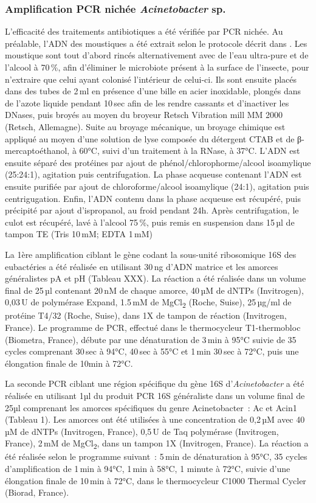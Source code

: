 \subsubsection{Amplification PCR nichée \textit{Acinetobacter} sp.}

L'efficacité des traitements antibiotiques a été vérifiée par PCR nichée.
Au préalable, l'ADN des moustiques a été extrait selon le protocole décrit dans \textcite{zouache2009}.
Les moustique sont tout d'abord rincés alternativement avec de l'eau ultra-pure et de l'alcool à 70\,\%, afin d'éliminer le microbiote présent à la surface de l'insecte, pour n'extraire que celui ayant colonisé l'intérieur de celui-ci.
Ils sont ensuite placés dans des tubes de 2\,ml en présence d'une bille en acier inoxidable, plongés dans de l'azote liquide pendant 10\,sec afin de les rendre cassants et d'inactiver les DNases, puis broyés au moyen du broyeur Retsch Vibration mill MM 2000 (Retsch, Allemagne).
Suite au broyage mécanique, un broyage chimique est appliqué au moyen d'une solution de lyse composée du détergent CTAB et de β-mercaptoéthanol, à 60°C, suivi d'un traitement à la RNase, à 37°C.
L'ADN est ensuite séparé des protéines par ajout de phénol/chlorophorme/alcool isoamylique (25:24:1), agitation puis centrifugation.
La phase acqueuse contenant l'ADN est ensuite purifiée par ajout de chloroforme/alcool isoamylique (24:1), agitation puis centrigugation.
Enfin, l'ADN contenu dans la phase acqueuse est récupéré, puis précipité par ajout d'ispropanol, au froid pendant 24h.
Après centrifugation, le culot est récupéré, lavé à l'alcool 75\,\%, puis remis en suspension dans 15\,µl de tampon TE (Tris 10\,mM; EDTA 1\,mM)

La 1ère amplification ciblant le gène codant la sous-unité ribosomique 16S des eubactéries a été réalisée en utilisant 30\,ng d'ADN matrice et les amorces généralistes pA et pH (Tableau XXX).
La réaction a été réalisée dans un volume final de 25\,µl contenant 20\,nM de chaque amorce, 40\,µM de dNTPs (Invitrogen), 0,03\,U de polymérase Expand, 1.5\,mM de MgCl\textsubscript{2} (Roche, Suise), 25\,µg/ml de protéine T4/32 (Roche, Suise), dans 1X de tampon de réaction (Invitrogen, France).
Le programme de PCR, effectué dans le thermocycleur T1-thermobloc (Biometra, France), débute par une dénaturation de 3\,min à 95°C suivie de 35 cycles comprenant 30\,sec à 94°C, 40\,sec à 55°C et 1\,min 30\,sec à 72°C, puis une élongation finale de 10min à 72°C.

La seconde PCR ciblant une région spécifique du gène 16S d'\textit{Acinetobacter} a été réalisée en utilisant 1µl du produit PCR 16S généraliste dans un volume final de 25µl comprenant les amorces spécifiques du genre Acinetobacter~: Ac et Acin1 (Tableau 1).
Les amorces ont été utilisées à une concentration de 0,2\,µM avec 40\,µM de dNTPs (Invitrogen, France), 0,5\,U de Taq polymérase (Invitrogen, France), 2\,mM de MgCl\textsubscript{2}, dans un tampon 1X (Invitrogen, France).
La réaction a été réalisée selon le programme suivant~: 5\,min de dénaturation à 95°C, 35 cycles d'amplification de 1\,min à 94°C, 1\,min à 58°C, 1 minute à 72°C, suivie d'une élongation finale de 10\,min à 72°C, dans le thermocycleur C1000 Thermal Cycler (Biorad, France).

